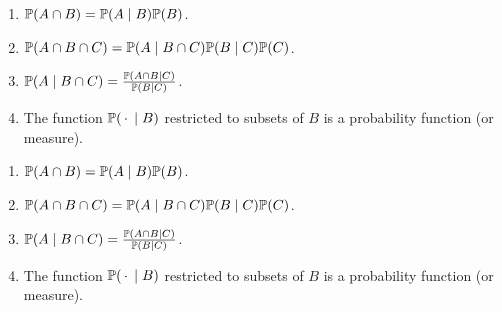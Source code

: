\begin{note}
  \begin{field}
    \begin{thm}\leavevmode
      \begin{enumerate}
        \item $\P(A\cap B) = \P(A\mid B)\P(B)$.
        \item $\P(A\cap B\cap C) = \P(A\mid B\cap C) \P(B\mid C) \P(C)$.
        \item $\P(A\mid B\cap C) = \frac{\P(A\cap B\mid C)}{\P(B\mid C)}$.
        \item The function $\P(\ph \mid B)$ restricted to subsets of $B$ is a probability function (or measure).
      \end{enumerate}
    \end{thm}
  \end{field}
  \begin{field}
    \begin{thm}\leavevmode
      \begin{enumerate}
        \item $\P(A\cap B) = \P(A\mid B)\P(B)$.
        \item $\P(A\cap B\cap C) = \P(A\mid B\cap C) \P(B\mid C) \P(C)$.
        \item $\P(A\mid B\cap C) = \frac{\P(A\cap B\mid C)}{\P(B\mid C)}$.
        \item The function $\P(\ph \mid B)$ restricted to subsets of $B$ is a probability function (or measure).
      \end{enumerate}
    \end{thm}
  \end{field}
  \xplain{}%
\end{note}

